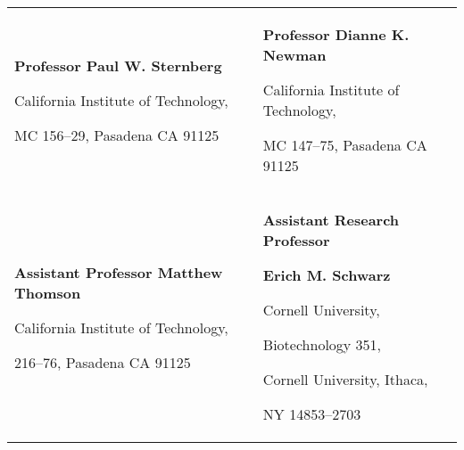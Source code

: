 
\begin{tabularx}{\textwidth}{@{}X X@{}}
\textbf{Professor Paul W. Sternberg}\par
  California Institute of Technology,\par
  MC 156--29, Pasadena CA 91125\par
  \makefield{\faEnvelopeO}{\url{pws@caltech.edu}}
&
\textbf{Professor Dianne K. Newman}\par
  California Institute of Technology,\par
  MC 147--75, Pasadena CA 91125\par
  \makefield{\faEnvelopeO}{\url{dkn@caltech.edu}}\\

\vspace{3mm}

\textbf{Assistant Professor Matthew Thomson}\par
  California Institute of Technology,\par
  216--76, Pasadena CA 91125\par
  \makefield{\faEnvelopeO}{\url{mthomson@caltech.edu}}
&
\vspace{3mm}
\textbf{Assistant Research Professor}\par
\textbf{Erich M. Schwarz}\par
  Cornell University,\par
  Biotechnology 351,\par
  Cornell University, Ithaca,\par
  NY 14853--2703\par
  \makefield{\faEnvelopeO}{\url{ems394@cornell.edu}}
\end{tabularx}
